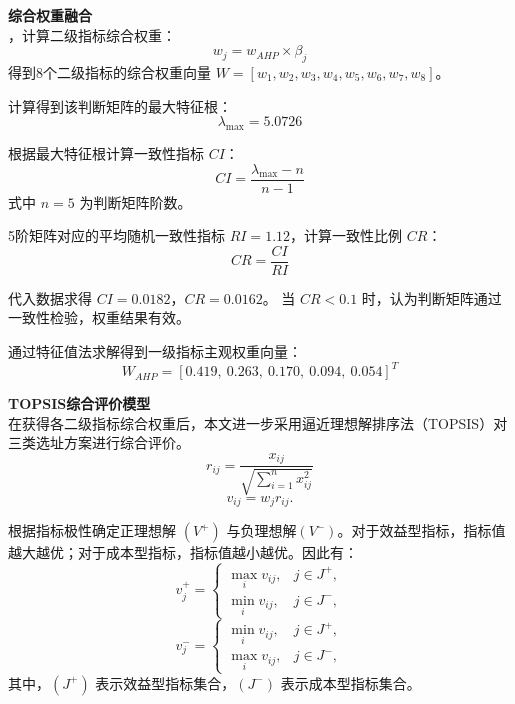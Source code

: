 \documentclass[12pt,a4paper]{article}
\begin{document}
\textbf{综合权重融合}\\
，计算二级指标综合权重：
\begin{equation}
w_j = w_{AHP} \times \beta_j
\end{equation}
得到8个二级指标的综合权重向量 $W = [w_1, w_2, w_3, w_4, w_5, w_6, w_7, w_8]$。

计算得到该判断矩阵的最大特征根：
\begin{equation}
\lambda_{\max} = 5.0726
\end{equation}

根据最大特征根计算一致性指标 $CI$：
\begin{equation}
CI = \frac{\lambda_{\max}-n}{n-1}
\end{equation}
式中 $n=5$ 为判断矩阵阶数。

5阶矩阵对应的平均随机一致性指标 $RI=1.12$，计算一致性比例 $CR$：
\begin{equation}
CR = \frac{CI}{RI}
\end{equation}

代入数据求得 $CI=0.0182$，$CR=0.0162$。
当 $CR<0.1$ 时，认为判断矩阵通过一致性检验，权重结果有效。

通过特征值法求解得到一级指标主观权重向量：
\[
W_{AHP} = [0.419,\ 0.263,\ 0.170,\ 0.094,\ 0.054]^T
\]




\textbf{TOPSIS综合评价模型}\\

在获得各二级指标综合权重后，本文进一步采用逼近理想解排序法（TOPSIS）对三类选址方案进行综合评价。
\begin{equation}
r_{ij}=\frac{x_{ij}}{\sqrt{\sum_{i=1}^{n}x_{ij}^{2}}}
\end{equation}
\begin{equation}
v_{ij}=w_j r_{ij}.
\end{equation}

根据指标极性确定正理想解 $(V^+)$ 与负理想解$ (V^-)$。对于效益型指标，指标值越大越优；对于成本型指标，指标值越小越优。因此有：
\begin{equation}
v_j^+=
\begin{cases}
\max\limits_i v_{ij}, & j\in J^+,\\
\min\limits_i v_{ij}, & j\in J^-,
\end{cases}
\end{equation}
\begin{equation}
v_j^-=
\begin{cases}
\min\limits_i v_{ij}, & j\in J^+,\\
\max\limits_i v_{ij}, & j\in J^-,
\end{cases}
\end{equation}
其中，$(J^+)$ 表示效益型指标集合，$(J^-)$ 表示成本型指标集合。
\end{document}
